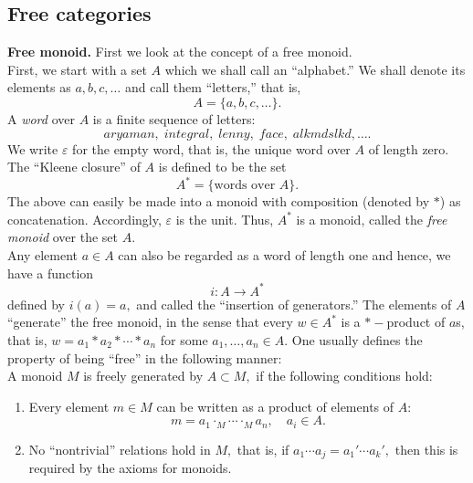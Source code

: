 \subsection{Free categories}\label{ssec:free}
\textbf{Free monoid.} First we look at the concept of a free monoid.\\
First, we start with a set $A$ which we shall call an ``alphabet.'' We shall denote its elements as $a, b, c, \ldots$ and call them ``letters,'' that is,
\begin{equation*} 
	A = \{a, b, c, \ldots\}.
\end{equation*}
A \emph{word} over $A$ is a finite sequence of letters:
\begin{equation*} 
	aryaman,\;integral,\;lenny,\;face,\;alkmdslkd,\ldots.
\end{equation*}
We write $\varepsilon$ for the empty word, that is, the unique word over $A$ of length zero. The ``Kleene closure'' of $A$ is defined to be the set 
\begin{equation*} 
	A^* = \{\text{words over }A\}.
\end{equation*}
The above can easily be made into a monoid with composition (denoted by $*$) as concatenation. Accordingly, $\varepsilon$ is the unit. Thus, $A^*$ is a monoid, called the \emph{free monoid} over the set $A.$\\
Any element $a \in A$ can also be regarded as a word of length one and hence, we have a function
\begin{equation*} 
	i:A \to A^*
\end{equation*}
defined by $i(a) = a,$ and called the ``insertion of generators.'' The elements of $A$ ``generate'' the free monoid, in the sense that every $w \in A^*$ is a $*-$product of $a$s, that is, $w = a_1*a_2*\cdots *a_n$ for some $a_1, \ldots, a_n \in A.$ One usually defines the property of being ``free'' in the following manner:\\
A monoid $M$ is freely generated by $A \subset M,$ if the following conditions hold:
\begin{enumerate}
	\item Every element $m \in M$ can be written as a product of elements of $A:$
	\begin{equation*} 
		m = a_1 \cdot_M \cdots \cdot_M a_n, \quad a_i \in A.
	\end{equation*}
	\item No ``nontrivial'' relations hold in $M,$ that is, if $a_1\cdots a_j = a_1'\cdots a_k',$ then this is required by the axioms for monoids.
\end{enumerate}
